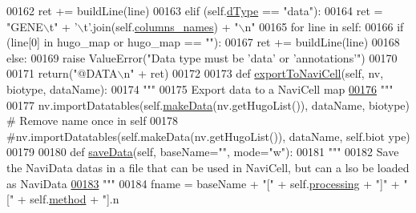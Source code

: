 \begin{DoxyCode}
00162                 ret += buildLine(line)
00163         \textcolor{keywordflow}{elif} (self.\hyperlink{classnavicom_1_1navidata_1_1NaviData_a89cf0727f26dba8aabb38271d85b169d}{dType} == \textcolor{stringliteral}{"data"}):
00164             ret = \textcolor{stringliteral}{"GENE\(\backslash\)t"} + \textcolor{stringliteral}{'\(\backslash\)t'}.join(self.\hyperlink{classnavicom_1_1navidata_1_1NaviData_aebce9bba220d01776cbd5a214d2d3013}{columns_names}) + \textcolor{stringliteral}{"\(\backslash\)n"}
00165             \textcolor{keywordflow}{for} line \textcolor{keywordflow}{in} self:
00166                 \textcolor{keywordflow}{if} (line[0] \textcolor{keywordflow}{in} hugo\_map \textcolor{keywordflow}{or} hugo\_map == \textcolor{stringliteral}{""}):
00167                     ret += buildLine(line)
00168         \textcolor{keywordflow}{else}:
00169             \textcolor{keywordflow}{raise} ValueError(\textcolor{stringliteral}{"Data type must be 'data' or 'annotations'"})
00170 
00171         \textcolor{keywordflow}{return}(\textcolor{stringliteral}{"@DATA\(\backslash\)n"} + ret)
00172 
00173     \textcolor{keyword}{def }\hyperlink{classnavicom_1_1navidata_1_1NaviData_a485fbc0ffff49b94f3736b2a0f8cb54e}{exportToNaviCell}(self, nv, biotype, dataName):
00174         \textcolor{stringliteral}{"""}
00175 \textcolor{stringliteral}{        Export data to a NaviCell map}
\hypertarget{navidata_8py_source_l00176}{}\hyperlink{classnavicom_1_1navidata_1_1NaviData_a485fbc0ffff49b94f3736b2a0f8cb54e}{00176} \textcolor{stringliteral}{        """}
00177         nv.importDatatables(self.\hyperlink{classnavicom_1_1navidata_1_1NaviData_a0ad79f0fbf4ab86ca13255069bf98632}{makeData}(nv.getHugoList()), dataName, biotype) \textcolor{comment}{#
       Remove name once in self}
00178         \textcolor{comment}{#nv.importDatatables(self.makeData(nv.getHugoList()), dataName, self.biot
      ype)}
00179 
00180     \textcolor{keyword}{def }\hyperlink{classnavicom_1_1navidata_1_1NaviData_a3dfc92056e5fc254e80607cef39234bf}{saveData}(self, baseName="", mode="w"):
00181         \textcolor{stringliteral}{"""}
00182 \textcolor{stringliteral}{        Save the NaviData datas in a file that can be used in NaviCell, but can a
      lso be loaded as NaviData}
\hypertarget{navidata_8py_source_l00183}{}\hyperlink{classnavicom_1_1navidata_1_1NaviData_a3dfc92056e5fc254e80607cef39234bf}{00183} \textcolor{stringliteral}{        """}
00184         fname = baseName + \textcolor{stringliteral}{"["} + self.\hyperlink{classnavicom_1_1navidata_1_1NaviData_ab3f30d76377459fe539f440df162ea59}{processing} + \textcolor{stringliteral}{"]"} + \textcolor{stringliteral}{"["} + self.\hyperlink{classnavicom_1_1navidata_1_1NaviData_ae8f909ed788b49a3c894251957e2f732}{method} + \textcolor{stringliteral}{"].n
}
\end{DoxyCode}
